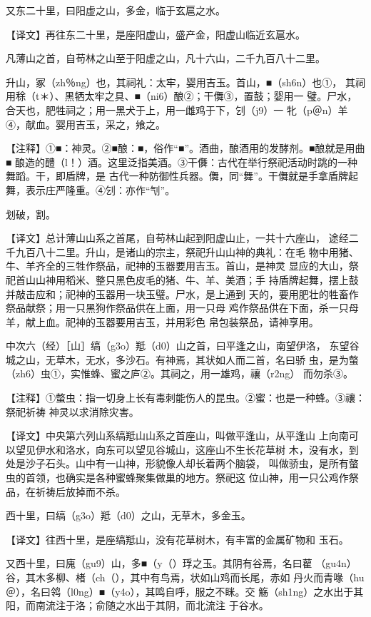 \documentclass[a4paper,12pt,UTF8,twoside]{ctexbook}
\begin{document}
又东二十里，曰阳虚之山，多金，临于玄扈之水。

【译文】再往东二十里，是座阳虚山，盛产金，阳虚山临近玄扈水。

凡薄山之首，自苟林之山至于阳虚之山，凡十六山，二千九百八十二里。

升山，冢（zh％ng）也，其祠礼：太牢，婴用吉玉。首山，■（sh6n）也①， 其祠用稌（t＊）、黑牺太牢之具、■（ni6）酿②；干儛③，置鼓；婴用一 璧。尸水，合天也，肥牲祠之；用一黑犬于上，用一雌鸡于下，刉（j9）一 牝（p＠n）羊④，献血。婴用吉玉，采之，飨之。

【注释】①■：神灵。②■酿：■，俗作“■”。酒曲，酿酒用的发酵剂。■酿就是用曲■ 酿造的醴（l！）酒。这里泛指美酒。③干儛：古代在举行祭祀活动时跳的一种舞蹈。干，即盾牌，是 古代一种防御性兵器。儛，同“舞”。干儛就是手拿盾牌起舞，表示庄严隆重。④刉：亦作“刏”。

划破，割。

【译文】总计薄山山系之首尾，自苟林山起到阳虚山止，一共十六座山， 途经二千九百八十二里。升山，是诸山的宗主，祭祀升山山神的典礼：在毛 物中用猪、牛、羊齐全的三牲作祭品，祀神的玉器要用吉玉。首山，是神灵 显应的大山，祭祀首山山神用稻米、整只黑色皮毛的猪、牛、羊、美酒；手 持盾牌起舞，摆上鼓并敲击应和；祀神的玉器用一块玉璧。尸水，是上通到 天的，要用肥壮的牲畜作祭品献祭；用一只黑狗作祭品供在上面，用一只母 鸡作祭品供在下面，杀一只母羊，献上血。祀神的玉器要用吉玉，并用彩色 帛包装祭品，请神享用。

中次六（经）［山］缟（g3o）羝（d0）山之首，曰平逢之山，南望伊洛， 东望谷城之山，无草木，无水，多沙石。有神焉，其状如人而二首，名曰骄 虫，是为螫（zh6）虫①，实惟蜂、蜜之庐②。其祠之，用一雄鸡，禳（r2ng） 而勿杀③。

【注释】①螫虫：指一切身上长有毒刺能伤人的昆虫。②蜜：也是一种蜂。③禳：祭祀祈祷 神灵以求消除灾害。

【译文】中央第六列山系缟羝山山系之首座山，叫做平逢山，从平逢山 上向南可以望见伊水和洛水，向东可以望见谷城山，这座山不生长花草树 木，没有水，到处是沙子石头。山中有一山神，形貌像人却长着两个脑袋， 叫做骄虫，是所有螫虫的首领，也确实是各种蜜蜂聚集做巢的地方。祭祀这 位山神，用一只公鸡作祭品，在祈祷后放掉而不杀。

西十里，曰缟（g3o）羝（d0）之山，无草木，多金玉。

【译文】往西十里，是座缟羝山，没有花草树木，有丰富的金属矿物和 玉石。

又西十里，曰廆（gu9）山，多■（y（）琈之玉。其阴有谷焉，名曰雚 （gu4n）谷，其木多柳、楮（ch（），其中有鸟焉，状如山鸡而长尾，赤如 丹火而青喙（hu＠），名曰鸰（l0ng）■（y4o），其鸣自呼，服之不眯。交 觞（sh1ng）之水出于其阳，而南流注于洛；俞随之水出于其阴，而北流注 于谷水。
\end{document}
